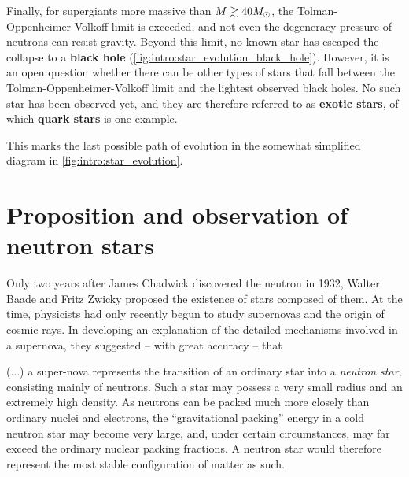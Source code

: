 Finally, for supergiants more massive than $M \gtrsim 40 M_\odot$, the Tolman-Oppenheimer-Volkoff limit is exceeded, and not even the degeneracy pressure of neutrons can resist gravity.
Beyond this limit, no known star has escaped the collapse to a \textbf{black hole} (\cref{fig:intro:star_evolution_black_hole}).
However, it is an open question whether there can be other types of stars that fall between the Tolman-Oppenheimer-Volkoff limit and the lightest observed black holes.
No such star has been observed yet, and they are therefore referred to as \textbf{exotic stars}, of which \textbf{quark stars} is one example.

This marks the last possible path of evolution in the somewhat simplified diagram in \cref{fig:intro:star_evolution}.

\section{Proposition and observation of neutron stars}
\label{sec:intro:pulsars}

Only two years after James Chadwick discovered the neutron in 1932, \cite{ref:neutron_discovery}
Walter Baade and Fritz Zwicky proposed the existence of stars composed of them.
At the time, physicists had only recently begun to study supernovas and the origin of cosmic rays.
In developing an explanation of the detailed mechanisms involved in a supernova, they suggested -- with great accuracy -- that
\cite[page 263]{ref:supernova_cosmic_rays_neutron_stars}
\begin{displayquote}
(...) %
a super-nova represents the transition of an ordinary star into a \emph{neutron star}, consisting mainly of neutrons.
Such a star may possess a very small radius and an extremely high density.
As neutrons can be packed much more closely than ordinary nuclei and electrons, the ``gravitational packing'' energy in a cold neutron star may become very large, and, under certain circumstances, may far exceed the ordinary nuclear packing fractions.
A neutron star would therefore represent the most stable configuration of matter as such.
\end{displayquote}

